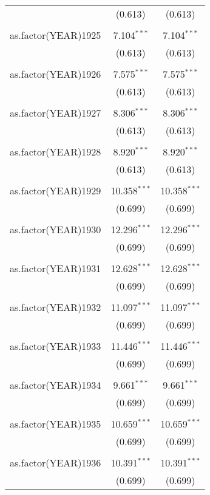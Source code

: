\begin{table}[!htbp]
\begin{tabular}{@{\extracolsep{5pt}}lcc}
  & (0.613) & (0.613) \\ 
  & & \\ 
 as.factor(YEAR)1925 & 7.104$^{***}$ & 7.104$^{***}$ \\ 
  & (0.613) & (0.613) \\ 
  & & \\ 
 as.factor(YEAR)1926 & 7.575$^{***}$ & 7.575$^{***}$ \\ 
  & (0.613) & (0.613) \\ 
  & & \\ 
 as.factor(YEAR)1927 & 8.306$^{***}$ & 8.306$^{***}$ \\ 
  & (0.613) & (0.613) \\ 
  & & \\ 
 as.factor(YEAR)1928 & 8.920$^{***}$ & 8.920$^{***}$ \\ 
  & (0.613) & (0.613) \\ 
  & & \\ 
 as.factor(YEAR)1929 & 10.358$^{***}$ & 10.358$^{***}$ \\ 
  & (0.699) & (0.699) \\ 
  & & \\ 
 as.factor(YEAR)1930 & 12.296$^{***}$ & 12.296$^{***}$ \\ 
  & (0.699) & (0.699) \\ 
  & & \\ 
 as.factor(YEAR)1931 & 12.628$^{***}$ & 12.628$^{***}$ \\ 
  & (0.699) & (0.699) \\ 
  & & \\ 
 as.factor(YEAR)1932 & 11.097$^{***}$ & 11.097$^{***}$ \\ 
  & (0.699) & (0.699) \\ 
  & & \\ 
 as.factor(YEAR)1933 & 11.446$^{***}$ & 11.446$^{***}$ \\ 
  & (0.699) & (0.699) \\ 
  & & \\ 
 as.factor(YEAR)1934 & 9.661$^{***}$ & 9.661$^{***}$ \\ 
  & (0.699) & (0.699) \\ 
  & & \\ 
 as.factor(YEAR)1935 & 10.659$^{***}$ & 10.659$^{***}$ \\ 
  & (0.699) & (0.699) \\ 
  & & \\ 
 as.factor(YEAR)1936 & 10.391$^{***}$ & 10.391$^{***}$ \\ 
  & (0.699) & (0.699) \\ 

\end{tabular}
\end{table}
